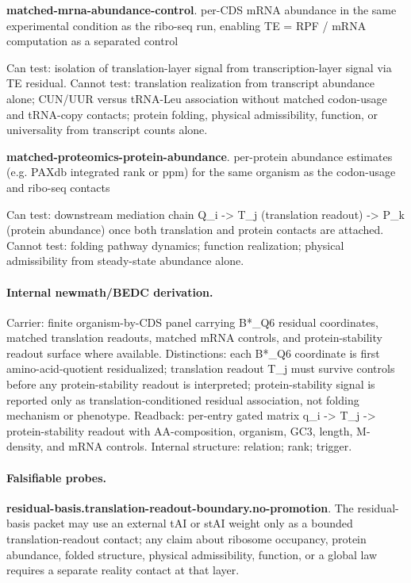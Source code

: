 \textbf{matched-mrna-abundance-control}. per-CDS mRNA abundance in the same experimental condition as the ribo-seq run, enabling TE = RPF / mRNA computation as a separated control

Can test: isolation of translation-layer signal from transcription-layer signal via TE residual. Cannot test: translation realization from transcript abundance alone; CUN/UUR versus tRNA-Leu association without matched codon-usage and tRNA-copy contacts; protein folding, physical admissibility, function, or universality from transcript counts alone.

\textbf{matched-proteomics-protein-abundance}. per-protein abundance estimates (e.g. PAXdb integrated rank or ppm) for the same organism as the codon-usage and ribo-seq contacts

Can test: downstream mediation chain Q\_i -> T\_j (translation readout) -> P\_k (protein abundance) once both translation and protein contacts are attached. Cannot test: folding pathway dynamics; function realization; physical admissibility from steady-state abundance alone.

\paragraph{Internal newmath/BEDC derivation.} Carrier: finite organism-by-CDS panel carrying B*\_Q6 residual coordinates, matched translation readouts, matched mRNA controls, and protein-stability readout surface where available. Distinctions: each B*\_Q6 coordinate is first amino-acid-quotient residualized; translation readout T\_j must survive controls before any protein-stability readout is interpreted; protein-stability signal is reported only as translation-conditioned residual association, not folding mechanism or phenotype. Readback: per-entry gated matrix q\_i -> T\_j -> protein-stability readout with AA-composition, organism, GC3, length, M-density, and mRNA controls. Internal structure: relation; rank; trigger.

\paragraph{Falsifiable probes.}
\textbf{residual-basis.translation-readout-boundary.no-promotion}. The residual-basis packet may use an external tAI or stAI weight only as a bounded translation-readout contact; any claim about ribosome occupancy, protein abundance, folded structure, physical admissibility, function, or a global law requires a separate reality contact at that layer.

